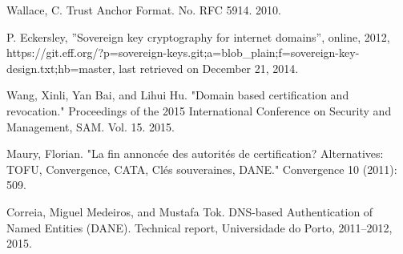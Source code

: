 \documentclass[journal, a4paper]{IEEEtran}
\begin{document}
\begin{thebibliography}{99}
 Wallace, C. Trust Anchor Format. No. RFC 5914. 2010.

 P. Eckersley, ''Sovereign key cryptography for internet domains'', online, 2012, https://git.eff.org/?p=sovereign-keys.git;a=blob\_plain;f=sovereign-key-design.txt;hb=master, last retrieved on December 21, 2014.

 Wang, Xinli, Yan Bai, and Lihui Hu. "Domain based certification and revocation." Proceedings of the 2015 International Conference on Security and Management, SAM. Vol. 15. 2015.

 Maury, Florian. "La fin annoncée des autorités de certification? Alternatives: TOFU, Convergence, CATA, Clés souveraines, DANE." Convergence 10 (2011): 509.

 Correia, Miguel Medeiros, and Mustafa Tok. DNS-based Authentication of Named Entities (DANE). Technical report, Universidade do Porto, 2011–2012, 2015.

\end{thebibliography}

\end{document}
